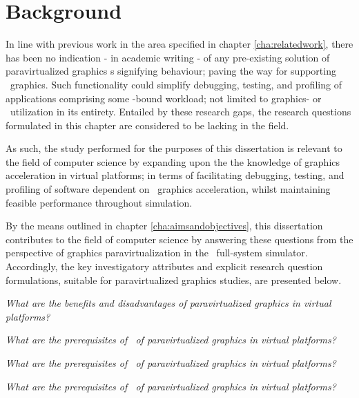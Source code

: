 

\chapter{Background}
\label{cha:background}
In line with previous work in the area specified in chapter \ref{cha:relatedwork}, there has been no indication - in academic writing - of any pre-existing solution of paravirtualized graphics \dvttermapi s signifying  behaviour; paving the way for supporting \dvttermreverseexecution\ graphics.
Such functionality could simplify debugging, testing, and profiling of applications comprising some \dvttermgpu -bound workload; not limited to graphics- or \dvttermgpu\ utilization in its entirety.
Entailed by these research gaps, the research questions formulated in this chapter are considered to be lacking in the field.

As such, the study performed for the purposes of this dissertation is relevant to the field of computer science by expanding upon the the knowledge of graphics acceleration in virtual platforms; in terms of facilitating debugging, testing, and profiling of software dependent on \dvttermgpu\ graphics acceleration, whilst maintaining feasible performance throughout simulation.

By the means outlined in chapter \ref{cha:aimsandobjectives}, this dissertation contributes to the field of computer science by answering these questions from the perspective of graphics paravirtualization in the \dvttermsimics\ full-system simulator.
Accordingly, the key investigatory attributes and explicit research question formulations, suitable for paravirtualized graphics studies, are presented below.

\newcommand*\researchquestionitem[2]{\item[#1:] \textit{#2}}
\begin{multicols}{2}
\begin{itemize*}
	\researchquestionitem{1}{What are the benefits and disadvantages of paravirtualized graphics in virtual platforms?}
	\researchquestionitem{2}{What are the prerequisites of \dvttermdeterministicexecution\  of paravirtualized graphics in virtual platforms?}
	\researchquestionitem{3}{What are the prerequisites of \dvttermcheckpointing\ of paravirtualized graphics in virtual platforms?}
	\researchquestionitem{4}{What are the prerequisites of \dvttermreverseexecution\ of paravirtualized graphics in virtual platforms?}
\end{itemize*}
\end{multicols}

